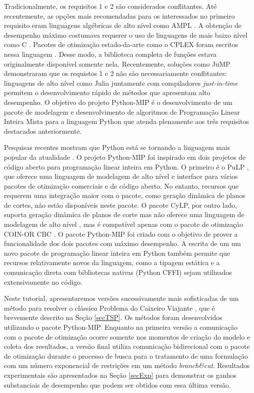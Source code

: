 \documentclass[a4paper,11pt,fleqn]{article}
\begin{document}
Tradicionalmente, os requisitos 1 e 2 são considerados conflitantes.
Até recentemente, as opções mais recomendadas para os interessados no primeiro requisito eram linguagens algébricas de alto nível como AMPL \citep{Fourer1987}.
A obtenção de desempenho máximo costumava requerer o uso de linguagens de mais baixo nível como C \citep{Johnson1991a}. 
Pacotes de otimização estado-da-arte como o CPLEX foram escritos nessa linguagem \citep{Bixby2002}. 
Desse modo, a biblioteca completa de funções estava originalmente disponível somente nela. 
Recentemente, soluções como JuMP \citep{Dunning2015,Castellucci2017} demonstraram que os requistos 1 e 2 não são necessariamente conflitantes: linguagens de alto nível como Julia juntamente com compiladores \emph{just-in-time} permitem o desenvolvimento rápido de métodos que apresentam alto desempenho. 
O objetivo do projeto Python-MIP é o desenvolvimento de um pacote de modelagem e desenvolvimento de algoritmos de Programação Linear Inteira Mista para a linguagem Python que atenda plenamente aos três requisitos destacados anteriormente.

Pesquisas recentes mostram que Python está se tornando a linguagem mais popular da atualidade \citep{pythonEconomist2018}. 
O projeto Python-MIP foi inspirado em dois projetos de código aberto para programação linear inteira em Python. 
O primeiro é o PuLP \citep{Mitchell2009}, que oferece uma linguagem de modelagem de alto nível e interface para vários pacotes de otimização comerciais e de código aberto. 
No entanto, recursos que requerem uma integração maior com o pacote, como geração dinâmica de planos de cortes, não estão disponíveis neste pacote. 
O pacote CyLP, por outro lado, suporta geração dinâmica de planos de corte mas não oferece uma linguagem de modelagem de alto nível \citep{Towhidi2016}, mas é compatível apenas com o pacote de otimização COIN-OR CBC \citep{Forrest2005}. 
O pacote Python-MIP foi criado com o objetivo de prover a funcionalidade dos dois pacotes com máximo desempenho. 
A escrita de um um novo pacote de programação linear inteira em Python também permite que recursos relativamente novos da linguagem, como a tipagem estática e a comunicação direta com bibliotecas nativas (Python CFFI) sejam utilizados extensivamente no código.

Neste tutorial, apresentaremos versões sucessivamente mais sofisticadas de um método para resolver o clássico Problema do Caixeiro Viajante \citep{Dantzig54,Miller1960,Applegate2006}, que é brevemente descrito na Seção \ref{secTSP}.
Os métodos foram desenvolvidos utilizando o pacote Python-MIP. 
Enquanto na primeira versão a comunicação com o pacote de otimização ocorre somente nos momentos de criação do modelo e coleta dos resultados, a versão final utiliza comunicação bidirecional com o pacote de otimização durante o processo de busca para o tratamento de uma formulação com um número exponencial de restrições em um método \emph{branch\&cut}. 
Resultados experimentais são apresentados na Seção \ref{secExp} para demonstrar os ganhos substanciais de desempenho que podem ser obtidos com essa última versão.
\end{document}
